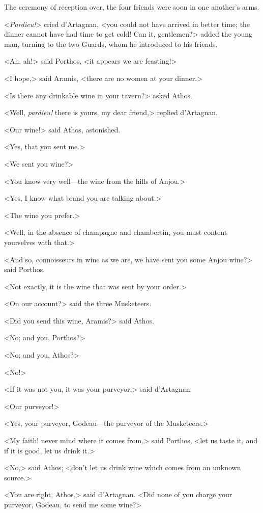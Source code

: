 The ceremony of reception over, the four friends were soon in one another's arms. 

<\textit{Pardieu!}> cried d'Artagnan, <you could not have arrived in better time; the dinner cannot have had time to get cold! Can it, gentlemen?> added the young man, turning to the two Guards, whom he introduced to his friends. 

<Ah, ah!> said Porthos, <it appears we are feasting!> 

<I hope,> said Aramis, <there are no women at your dinner.> 

<Is there any drinkable wine in your tavern?> asked Athos. 

<Well, \textit{pardieu!} there is yours, my dear friend,> replied d'Artagnan. 

<Our wine!> said Athos, astonished. 

<Yes, that you sent me.> 

<We sent you wine?> 

<You know very well---the wine from the hills of Anjou.> 

<Yes, I know what brand you are talking about.> 

<The wine you prefer.> 

<Well, in the absence of champagne and chambertin, you must content yourselves with that.> 

<And so, connoisseurs in wine as we are, we have sent you some Anjou wine?> said Porthos. 

<Not exactly, it is the wine that was sent by your order.> 

<On our account?> said the three Musketeers. 

<Did you send this wine, Aramis?> said Athos. 

<No; and you, Porthos?> 

<No; and you, Athos?> 

<No!> 

<If it was not you, it was your purveyor,> said d'Artagnan. 

<Our purveyor!> 

<Yes, your purveyor, Godeau---the purveyor of the Musketeers.> 

<My faith! never mind where it comes from,> said Porthos, <let us taste it, and if it is good, let us drink it.> 

<No,> said Athos; <don't let us drink wine which comes from an unknown source.> 

<You are right, Athos,> said d'Artagnan. <Did none of you charge your purveyor, Godeau, to send me some wine?> 

